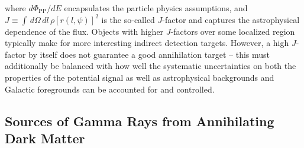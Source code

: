 where $d\Phi_\mathrm{PP}/dE$ encapsulates the particle physics assumptions, and $J\equiv\int\,d\Omega\,dl\,\rho[r(l,\psi)]^2$ is the so-called $J$-factor and captures the astrophysical dependence of the flux. Objects with higher $J$-factors over some localized region typically make for more interesting indirect detection targets. However, a high $J$-factor by itself does not guarantee a good annihilation target -- this must additionally be balanced with how well the systematic uncertainties on both the properties of the potential signal as well as astrophysical backgrounds and Galactic foregrounds can be accounted for and controlled.

\subsection{Sources of Gamma Rays from Annihilating Dark Matter}
\label{subsec:dmsources}

